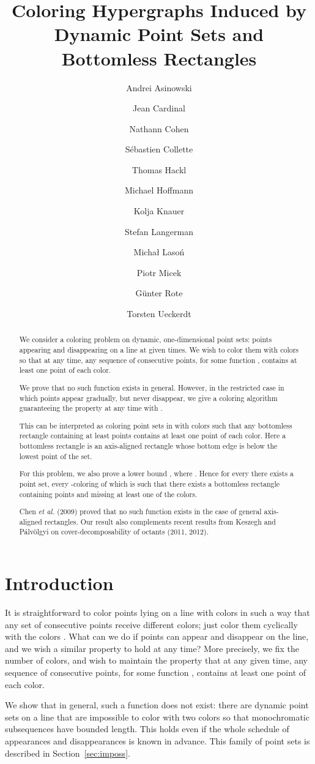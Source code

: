 \documentclass[11pt,a4paper]{amsart}
\title{Coloring Hypergraphs Induced by Dynamic Point Sets and Bottomless Rectangles}
\author{
Andrei Asinowski
\and 
Jean Cardinal
\and 
Nathann Cohen
\and 
S\'ebastien Collette
\and 
Thomas Hackl
\and 
Michael Hoffmann
\and 
Kolja Knauer
\and
Stefan Langerman
\and 
Micha{\l} Laso\'n
\and 
Piotr Micek
\and 
G\"unter Rote
\and 
Torsten Ueckerdt
}
\theoremstyle{plain}
\theoremstyle{definition}
\begin{document}
\pagestyle{empty}

\begin{abstract}
We consider a coloring problem on dynamic, one-dimensional point sets: points appearing and disappearing on a line at given times. We wish to color them with  colors so that at any time, any sequence of  consecutive points, for some function , contains at least one point of each color. 

We prove that no such function  exists in general. However, in the restricted case in which points appear gradually, but never disappear, we give a coloring algorithm guaranteeing the property at any time with . 

This can be interpreted as coloring point sets in  with  colors such that any bottomless rectangle containing at least  points contains at least one point of each color. Here a bottomless rectangle is an axis-aligned rectangle whose bottom edge is below the lowest point of the set.

For this problem, we also prove a lower bound , where . Hence for every  there exists a point set, every -coloring of which is such that there exists a bottomless rectangle containing  points and missing at least one of the  colors.

Chen {\em et al.} (2009) proved that no such function  exists in
the case of general axis-aligned rectangles. Our result also
complements recent results from Keszegh and P\'alv\"olgyi on
cover-decomposability of octants (2011, 2012).  
\end{abstract}
\maketitle
\sloppy

\section{Introduction}

It is straightforward to color  points lying on a line with  colors in such a way that any set of  consecutive points receive different colors; just color them cyclically with the colors . What can we do if points can appear and disappear on the line, and we wish a similar property to hold at any time? More precisely, we fix the number  of colors, and wish to maintain the property that at any given time, any sequence of  consecutive points, for some function , contains at least one point of each color.

We show that in general, such a function does not exist: there are dynamic point sets on a line that are impossible to color with two colors so that monochromatic subsequences have bounded length. This holds even if the whole schedule of appearances and disappearances is known in advance. This family of point sets is described in Section~\ref{sec:imposs}.
\end{document}

